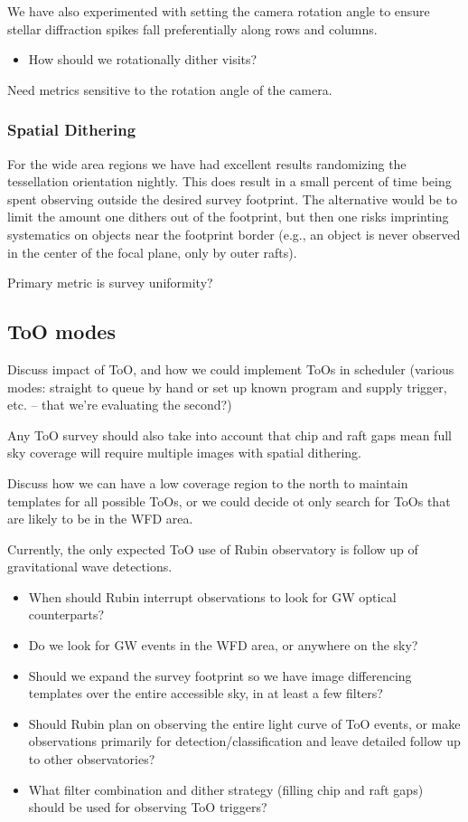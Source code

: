 We have also experimented with setting the camera rotation angle to ensure stellar diffraction spikes fall preferentially along rows and columns. 

\begin{itemize}
    \item{How should we rotationally dither visits?}
\end{itemize}

Need metrics sensitive to the rotation angle of the camera. 

\subsubsection{Spatial Dithering}

For the wide area regions we have had excellent results randomizing the tessellation orientation nightly. This does result in a small percent of time being spent observing outside the desired survey footprint. The alternative would be to limit the amount one dithers out of the footprint, but then one risks imprinting systematics on objects near the footprint border (e.g., an object is never observed in the center of the focal plane, only by outer rafts).

Primary metric is survey uniformity?


\subsection{ToO modes}
Discuss impact of ToO, and how we could implement ToOs in scheduler (various modes: straight to queue by hand or set up known program and supply trigger, etc. -- that we're evaluating the second?)

Any ToO survey should also take into account that chip and raft gaps mean full sky coverage will require multiple images with spatial dithering.

Discuss how we can have a low coverage region to the north to maintain templates for all possible ToOs, or we could decide ot only search for ToOs that are likely to be in the WFD area.

Currently, the only expected ToO use of Rubin observatory is follow up of gravitational wave detections.

\begin{itemize}
    \item{When should Rubin interrupt observations to look for GW optical counterparts?}
    \item{Do we look for GW events in the WFD area, or anywhere on the sky?}
    \item{Should we expand the survey footprint so we have image differencing templates over the entire accessible sky, in at least a few filters?}
    \item{Should Rubin plan on observing the entire light curve of ToO events, or make observations primarily for detection/classification and leave detailed follow up to other observatories?}
    \item{What filter combination and dither strategy (filling chip and raft gaps) should be used for observing ToO triggers? } 
\end{itemize}

